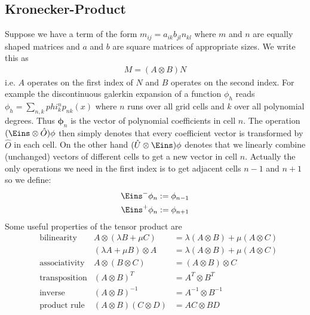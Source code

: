 \documentclass[a4paper,12pt]{scrartcl}
\renewcommand{\vec}[1]{{\mathbf{#1}}}
\begin{document}
\subsection{ Kronecker-Product}
Suppose we have a term of the form $m_{ij} = a_{ik}b_{jl}n_{kl}$ where 
$m$ and $n$ are equally shaped matrices and $a$ and $b$ are 
square matrices of appropriate sizes. We write this as
\begin{align}
    M = (A\otimes B) N
    \label{eq:kronecker_product}
\end{align}
i.e. $A$ operates on the first index of $N$ and $B$ operates on the 
second index. For example the discontinuous galerkin expansion of 
a function $\phi_h$ reads $\phi_h = \sum_{n,k} phi^n_{k} p_{nk}(x)$ where
$n$ runs over all grid cells and $k$ over all polynomial degrees. 
Thus $\vec \phi_n$ is the vector of polynomial coefficients in cell $n$.
The operation $(\Eins\otimes \hat O) \phi$ then simply denotes that every 
coefficient vector is transformed by $\hat O $ in each cell. On the other
hand $(\hat U \otimes \Eins) \phi$ denotes that we linearly combine
(unchanged) vectors of different cells to get a new vector in cell $n$.
Actually the only operations we need in the first index is to get 
adjacent cells $n-1$ and $n+1$ so we define:
\begin{align}
    \Eins^{-}\phi_n := \phi_{n-1}\\
    \Eins^{+}\phi_n := \phi_{n+1}
    \label{eq:operator_one}
\end{align}
Some useful properties of the tensor product are
\begin{subequations}
    \begin{align}
        &\text{bilinearity }&A\otimes(\lambda B+ \mu C) &= \lambda (A\otimes B)+ \mu (A\otimes C) \\
        &&(\lambda A+ \mu B)\otimes A& = \lambda (A\otimes B)+ \mu (A\otimes C) \\
        &\text{associativity}& A\otimes (B\otimes C) &= (A\otimes B)\otimes C\\
        &\text{transposition}&(A\otimes B)^T &= A^T \otimes B^T \\
        &\text{inverse}&(A\otimes B)^{-1} &= A^{-1}\otimes B^{-1} \\
        &\text{product rule}& (A\otimes B)(C\otimes D) &= AC\otimes BD
        \label{eq:tensor_product_properties}
    \end{align}
\end{subequations}
\end{document}
